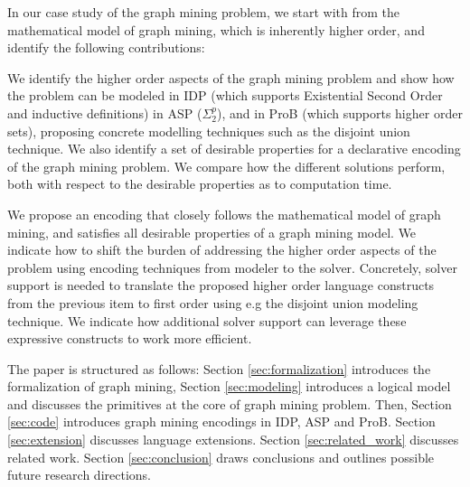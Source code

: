 In our case study of the graph mining problem, we start with from the mathematical model of graph mining, which is inherently higher order, and identify the following contributions:
\begin{compactitem}
\item We identify the higher order aspects of the graph mining problem and show how the problem can be modeled in IDP (which supports Existential Second Order and inductive definitions) in ASP ($\Sigma_{2}^{p}$), and in ProB (which supports higher order sets), proposing concrete modelling techniques such as the disjoint union technique. 
We also identify a set of desirable properties for a declarative encoding of the graph mining problem.
We compare how the different solutions perform, both with respect to the desirable properties as to computation time.
\item We propose an encoding that closely follows the mathematical model of graph mining, and satisfies all desirable properties of a graph mining model.
We indicate how to shift the burden of addressing the higher order aspects of the problem using encoding techniques from modeler to the solver. 
Concretely, solver support is needed to translate the proposed higher order language constructs from the previous item to first order using e.g the disjoint union modeling technique.
We indicate how additional solver support can leverage these expressive constructs to work more efficient.
\end{compactitem}
The paper is structured as follows: Section \ref{sec:formalization} introduces the formalization of graph mining, Section \ref{sec:modeling} introduces a logical model and discusses the primitives at the core of graph mining problem.
Then, Section \ref{sec:code} introduces graph mining encodings in IDP, ASP and ProB. Section \ref{sec:extension} discusses language extensions.
Section \ref{sec:related_work} discusses related work. Section \ref{sec:conclusion} draws conclusions and outlines possible future research directions.